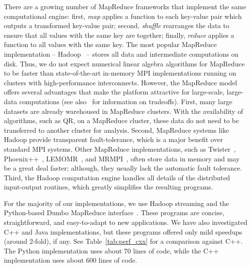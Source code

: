 \documentclass[10pt, conference, compsocconf]{IEEEtran}
\begin{document}
There are a growing number of MapReduce frameworks that implement the same computational engine: first, \emph{map} applies a function to each key-value pair which outputs a transformed key-value pair; second, \emph{shuffle} rearranges the data to ensure that all values with the same key are together; finally, \emph{reduce} applies a function to all values with the same key.  The most popular MapReduce implementation -- Hadoop~\cite{Hadoop2012-021} -- stores all data and intermediate computations on disk. Thus, we do not expect numerical linear algebra algorithms for MapReduce to be faster than state-of-the-art in-memory MPI implementations running on clusters with high-performance interconnects.  However, the MapReduce model offers several advantages that make the platform attractive for large-scale, large-data computations (see also~\cite{Zhao2009-MapReduce} for information on tradeoffs).  
First, many large datasets are already warehoused in MapReduce clusters.  With the availability of algorithms, such as QR, on a MapReduce cluster, these data do not need to be transferred to another  cluster for analysis.  Second, MapReduce systems like Hadoop provide transparent fault-tolerance, which is a major benefit over standard MPI systems.  Other MapReduce implementations, such as Twister~\cite{Ekanayake-2010-Twister}, Phoenix++~\cite{Talbot-2011-pheonix++}, LEMOMR~\cite{Fadika-2011-benchmarking}, and MRMPI~\cite{Plimpton-2011-MRMPI}, often store data in memory and may be a great deal faster; although, they usually lack the automatic fault tolerance.  Third, the Hadoop computation engine handles all details of the distributed input-output routines, which greatly simplifies the resulting programs.

For the majority of our implementations, we use Hadoop streaming and the Python-based Dumbo MapReduce interface~\cite{Dumbo2012}. These programs are concise, straightforward, and easy-to-adapt to new applications.  We have also investigated C++ and Java implementations, but these programs offered only mild speedups (around 2-fold), if any. See Table~\ref{tab:perf_cxx} for a comparison against C++.  
The Python implementation uses about 70 lines of code, while the C++ implementation uses about 600 lines of code.  
\end{document}
